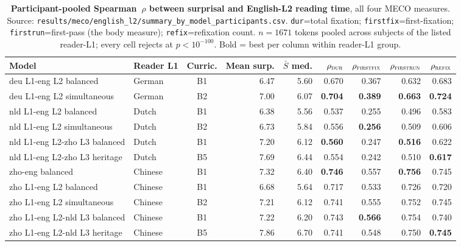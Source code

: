 \begin{table}[!ht]
  \centering
  \small
  \setlength{\tabcolsep}{4.5pt}
  \caption{\textbf{Participant-pooled Spearman~$\rho$ between \beetle{} surprisal and English-L2 reading time}, all four MECO measures. Source: \texttt{results/meco/english\_l2/summary\_by\_model\_participants.csv}. \texttt{dur}=total fixation; \texttt{firstfix}=first-fixation; \texttt{firstrun}=first-pass (the body measure); \texttt{refix}=refixation count. $n=1671$ tokens pooled across subjects of the listed reader-L1; every cell rejects at $p<10^{-100}$. Bold = best per column within reader-L1 group.}
  \label{tab:meco_english_l2_participants}
  \begin{tabular}{llcrrrrrr}
    \toprule
    Model & Reader L1 & Curric. & Mean surp. & $\bar S$ med. & $\rho_\textsc{dur}$ & $\rho_\textsc{firstfix}$ & $\rho_\textsc{firstrun}$ & $\rho_\textsc{refix}$ \\
    \midrule
    deu L1-eng L2 balanced               & German  & B1 & 6.47 & 5.60 & 0.670 & 0.367 & 0.632 & 0.683 \\
    deu L1-eng L2 simultaneous           & German  & B2 & 7.00 & 6.07 & \textbf{0.704} & \textbf{0.389} & \textbf{0.663} & \textbf{0.724} \\
    \midrule
    nld L1-eng L2 balanced               & Dutch   & B1 & 6.38 & 5.56 & 0.537 & 0.255 & 0.496 & 0.583 \\
    nld L1-eng L2 simultaneous           & Dutch   & B2 & 6.73 & 5.84 & 0.556 & \textbf{0.256} & 0.509 & 0.606 \\
    nld L1-eng L2-zho L3 balanced        & Dutch   & B1 & 7.20 & 6.12 & \textbf{0.560} & 0.247 & \textbf{0.516} & 0.622 \\
    nld L1-eng L2-zho L3 heritage        & Dutch   & B5 & 7.69 & 6.44 & 0.554 & 0.242 & 0.510 & \textbf{0.617} \\
    \midrule
    zho-eng balanced                     & Chinese & B1 & 7.32 & 6.40 & \textbf{0.746} & 0.557 & \textbf{0.756} & 0.745 \\
    zho L1-eng L2 balanced               & Chinese & B1 & 6.68 & 5.64 & 0.717 & 0.533 & 0.726 & 0.720 \\
    zho L1-eng L2 simultaneous           & Chinese & B2 & 7.21 & 6.12 & 0.741 & 0.555 & 0.752 & 0.745 \\
    zho L1-eng L2-nld L3 balanced        & Chinese & B1 & 7.22 & 6.20 & 0.743 & \textbf{0.566} & 0.754 & 0.740 \\
    zho L1-eng L2-nld L3 heritage        & Chinese & B5 & 7.86 & 6.70 & 0.741 & 0.548 & 0.750 & \textbf{0.745} \\
    \bottomrule
  \end{tabular}
\end{table}



